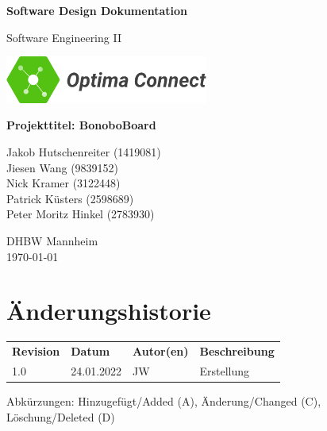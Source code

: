 \documentclass[a4paper,11pt]{scrartcl}
\begin{document}
\renewcommand*{\arraystretch}{1.2}
\begin{titlepage}
    \begin{center}
        \vspace*{1cm}\Huge
        \textbf{Software Design Dokumentation}\par                
        \vspace{0.5cm}\LARGE        
        Software Engineering II\par           
        \vspace{2cm}
        \includegraphics[width=0.5\textwidth]{OptimaLogo_long}\par   
        \vspace{1cm}
        \textbf{Projekttitel: BonoboBoard}\par        
        \vfill\Large   
        Jakob Hutschenreiter (1419081)\\Jiesen Wang (9839152)\\Nick Kramer (3122448)\\Patrick Küsters (2598689)\\Peter Moritz Hinkel (2783930)\par
        \vspace{2cm}
        DHBW Mannheim\\
        \today     
    \end{center}
\end{titlepage}

\section*{Änderungshistorie}
\begin{table}[h]
	\begin{tabular}{@{} p{20mm} p{25mm} p{25mm} p{75mm}}
		\textbf{Revision} & \textbf{Datum} & \textbf{Autor(en)} & \textbf{Beschreibung}\\
		1.0 & 24.01.2022 & JW & Erstellung\\ 
	\end{tabular}
\end{table}
\noindent
Abkürzungen: Hinzugefügt/Added (A), Änderung/Changed (C), Löschung/Deleted (D)
\vspace{2cm}
\tableofcontents
\newpage
{}
\end{document}

